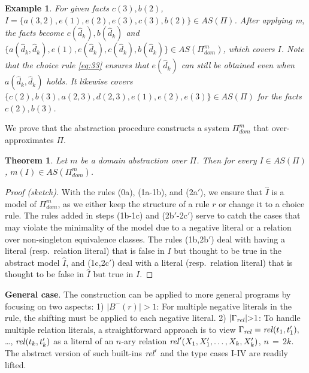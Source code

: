 \documentclass{new_tlp}
\newcommand{\comment}[1]{{\bf\color{blue}{*** #1 ***}}}
\newcommand{\comment}[1]{}
\newcommand{\leanparagraph}[1]{\smallskip\noindent\textbf{#1}. }
\def\mi#1{\mathit{#1\/}}
\newtheorem{thm}{Theorem}[section]
\newtheorem{exmp}{Example}
\begin{document}
\begin{exmp}
For given facts $c(3),b(2)$, %
$I =\{a(3,2),e(1),e(2),e(3),c(3),b(2)\} \in AS(\Pi)$. %
After applying m, %
the facts become $c(\hat{d}_k),b(\hat{d}_k)$ and %
$\{a(\hat{d}_k,\hat{d}_k),e(1),e(\hat{d}_k),c(\hat{d}_k),b(\hat{d}_k)\} \in AS(\Pi^m_{dom})$, which covers %
$I$. Note that the choice rule \eqref{eq:33} ensures
that $e(\hat{d}_k)$ can still be obtained even 
w\textbf{}hen $a(\hat{d}_k,\hat{d}_k)$ holds. It likewise covers %
$\{c(2), b(3), a(2,3), d(2,3), e(1), e(2), e(3)\} \in AS(\Pi)$ for the facts $c(2),b(3)$.

\end{exmp}

We prove that the abstraction procedure constructs a system $\Pi_{dom}^m$ that over-approximates $\Pi$.

\begin{thm}
Let $m$ be a domain abstraction over $\Pi$. %
Then for every %
$I \in AS(\Pi)$, $m(I) \in AS(\Pi_{dom}^m)$.
\end{thm}

\begin{proof}[Proof (sketch)]
With the 
rules (0a), (1a-1b), and (2a$'$), we ensure that
$\widehat{I}$ is a
model
of %
$\Pi^m_{dom}$, as we either keep the structure
of a rule $r$ or change it to a choice rule. The rules added in steps
(1b-1c) and (2b$'$-2c$'$) 
serve to catch the cases that may
violate the minimality of the model due to a negative literal or a
relation over non-singleton equivalence classes. The rules (1b,2b$'$) deal with
having a literal (resp.\ relation literal) that is false in
$I$ but thought to be true in the abstract model $\hat{I}$, and (1c,2c$'$)
deal with 
a literal (resp.\ relation literal) that is thought to be false in 
$\hat{I}$ but true in $I$.
\end{proof}
\vspace*{-0.4\baselineskip}


\leanparagraph{General case} The construction can be applied to more general programs by focusing on two aspects: 1) $|B^-(r)|{>}1$: For multiple negative literals in the rule, the shifting must be applied to each negative literal. 2) $|\Gamma_{\mi{rel}}|{>}1$: To handle multiple relation literals, a straightforward approach is to view $\Gamma_{\mi{rel}} = \mi{rel}(t_1,t'_1),$ \ldots, $\mi{rel}(t_k,t'_k)$ as 
a literal of an $n$-ary relation $\mi{rel}'(X_1,X'_1,\ldots,X_k,X'_k)$, $n\,{=}\,2k$.
The abstract version of such built-ins $\mi{rel}'$ and the type cases I-IV are readily lifted.%
\end{document}
